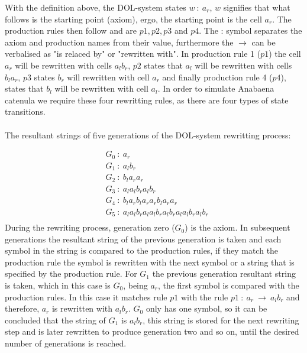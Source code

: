 \noindent
With the definition above, the DOL-system states $w~ :~ a_r$, $w$ signifies that what follows is the starting point (axiom), ergo, the starting point is the cell $a_r$. The production rules then follow and are $p1, p2, p3$ and $p4$. The : symbol separates the axiom and production names from their value, furthermore the $\rightarrow$ can be verbalised as "is relaced by" or "rewritten with". In production rule 1 ($p1$) the cell $a_r$ will be rewritten with cells $a_l b_r$, $p2$ states that $a_l$ will be rewritten with cells $b_l a_r$, $p3$ states $b_r$ will rewritten with cell $a_r$ and finally production rule 4 ($p4$), states that $b_l$ will be rewritten with cell $a_l$. In order to simulate Anabaena catenula we require these four rewritting rules, as there are four types of state transitions. \\
\\
The resultant strings of five generations of the DOL-system rewritting process: 

\begin{equation} \label{DOL-system result string}
\begin{aligned}
	& G_0~ :~ a_r \\
	& G_1~ :~ a_l b_r \\
	& G_2~ :~ b_l a_r a_r \\
	& G_3~ :~ a_l a_l b_r a_l b_r \\
	& G_4~ :~ b_l a_r b_l a_r a_r b_l a_r a_r \\
	& G_5~ :~ a_l a_l b_r a_l a_l b_r a_l b_r a_l a_l b_r a_l b_r \\
\end{aligned}
\end{equation}
\noindent
During the rewriting process, generation zero ($G_0$) is the axiom. In subsequent generations the resultant string of the previous generation is taken and each symbol in the string is compared to the production rules, if they match the production rule the symbol is rewritten with the next symbol or a string that is specified by the production rule. For $G_1$ the previous generation resultant string is taken, which in this case is $G_0$, being $a_r$, the first symbol is compared with the production rules. In this case it matches rule $p1$ with the rule $p1~ :~ a_r~ \rightarrow~ a_l b_r$ and therefore, $a_r$ is rewritten with $a_l b_r$. $G_0$ only has one symbol, so it can be concluded that the string of $G_1$ is $a_l b_r$, this string is stored for the next rewriting step and is later rewritten to produce generation two and so on, until the desired number of generations is reached.

